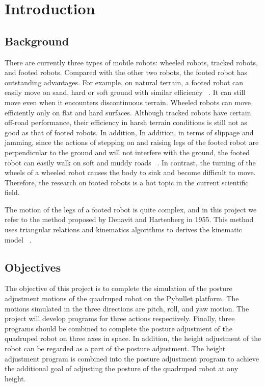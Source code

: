 \chapter{Introduction}

\section{Background}

There are currently three types of mobile robots: wheeled robots, tracked robots, and footed robots. Compared with the other two robots, the footed robot has outstanding advantages. For example, on natural terrain, a footed robot can easily move on sand, hard or soft ground with similar efficiency ~\cite{ref:1C2D}. It can still move even when it encounters discontinuous terrain. Wheeled robots can move efficiently only on flat and hard surfaces. Although tracked robots have certain off-road performance, their efficiency in harsh terrain conditions is still not as good as that of footed robots. In addition, In addition, in terms of slippage and jamming, since the actions of stepping on and raising legs of the footed robot are perpendicular to the ground and will not interfere with the ground, the footed robot can easily walk on soft and muddy roads ~\cite{ref:1C2D}. In contrast, the turning of the wheels of a wheeled robot causes the body to sink and become difficult to move. Therefore, the research on footed robots is a hot topic in the current scientific field.

The motion of the legs of a footed robot is quite complex, and in this project we refer to the method proposed by Denavit and Hartenberg in 1955. This method uses triangular relations and kinematics algorithms to derives the kinematic model ~\cite{ref:1C2D}.

\section{Objectives}

The objective of this project is to complete the simulation of the posture adjustment motions of the quadruped robot on the Pybullet platform. The motions simulated in the three directions are pitch, roll, and yaw motion. The project will develop programs for three actions respectively. Finally, three programs should be combined to complete the posture adjustment of the quadruped robot on three axes in space. In addition, the height adjustment of the robot can be regarded as a part of the posture adjustment. The height adjustment program is combined into the posture adjustment program to achieve the additional goal of adjusting the posture of the quadruped robot at any height.
